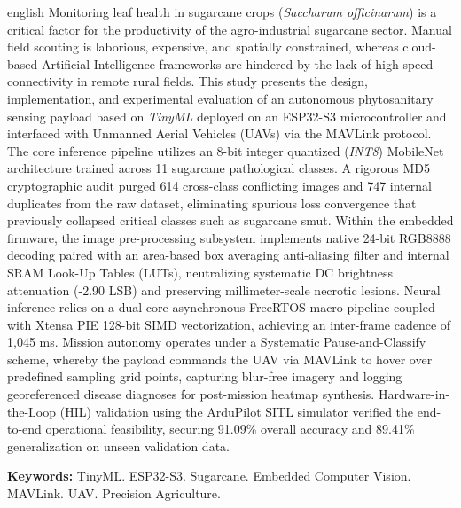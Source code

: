 \documentclass[
    12pt,
    openright,
    oneside,
    a4paper,
    chapter=TITLE,
    section=TITLE,
    english,
    brazil
]{abntex2}
\begin{document}
\begin{resumo}[Abstract]
\begin{otherlanguage*}{english}
Monitoring leaf health in sugarcane crops (\textit{Saccharum officinarum}) is a critical factor for the productivity of the agro-industrial sugarcane sector. Manual field scouting is laborious, expensive, and spatially constrained, whereas cloud-based Artificial Intelligence frameworks are hindered by the lack of high-speed connectivity in remote rural fields. This study presents the design, implementation, and experimental evaluation of an autonomous phytosanitary sensing payload based on \textit{TinyML} deployed on an ESP32-S3 microcontroller and interfaced with Unmanned Aerial Vehicles (UAVs) via the MAVLink protocol. The core inference pipeline utilizes an 8-bit integer quantized (\textit{INT8}) MobileNet architecture trained across 11 sugarcane pathological classes. A rigorous MD5 cryptographic audit purged 614 cross-class conflicting images and 747 internal duplicates from the raw dataset, eliminating spurious loss convergence that previously collapsed critical classes such as sugarcane smut. Within the embedded firmware, the image pre-processing subsystem implements native 24-bit RGB8888 decoding paired with an area-based box averaging anti-aliasing filter and internal SRAM Look-Up Tables (LUTs), neutralizing systematic DC brightness attenuation (-2.90 LSB) and preserving millimeter-scale necrotic lesions. Neural inference relies on a dual-core asynchronous FreeRTOS macro-pipeline coupled with Xtensa PIE 128-bit SIMD vectorization, achieving an inter-frame cadence of 1,045 ms. Mission autonomy operates under a Systematic Pause-and-Classify scheme, whereby the payload commands the UAV via MAVLink to hover over predefined sampling grid points, capturing blur-free imagery and logging georeferenced disease diagnoses for post-mission heatmap synthesis. Hardware-in-the-Loop (HIL) validation using the ArduPilot SITL simulator verified the end-to-end operational feasibility, securing 91.09\% overall accuracy and 89.41\% generalization on unseen validation data.

\textbf{Keywords:} TinyML. ESP32-S3. Sugarcane. Embedded Computer Vision. MAVLink. UAV. Precision Agriculture.
\end{otherlanguage*}
\end{resumo}

\listoffigures*
\cleardoublepage

\listoftables*
\cleardoublepage
\end{document}
